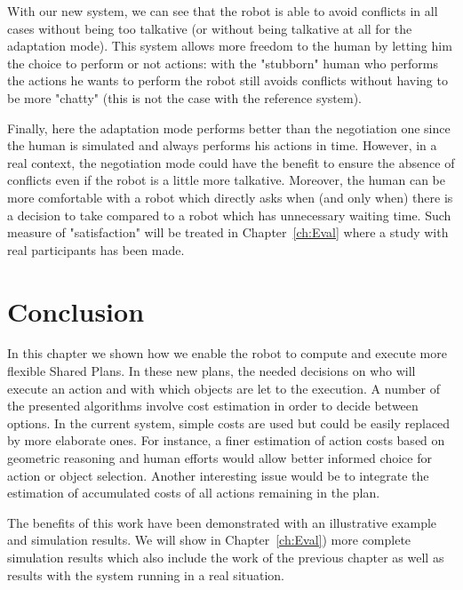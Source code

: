 \documentclass[english,a4paper,11pt,twoside]{StyleThese}
\begin{document}
With our new system, we can see that the robot is able to avoid conflicts in all cases without being too talkative (or without being talkative at all for the adaptation mode). This system allows more freedom to the human by letting him the choice to perform or not actions: with the "stubborn" human who performs the actions he wants to perform the robot still avoids conflicts without having to be more "chatty" (this is not the case with the reference system).

Finally, here the adaptation mode performs better than the negotiation one since the human is simulated and always performs his actions in time. However, in a real context, the negotiation mode could have the benefit to ensure the absence of conflicts even if the robot is a little more talkative. Moreover, the human can be more comfortable with a robot which directly asks when (and only when) there is a decision to take compared to a robot which has unnecessary waiting time. Such measure of "satisfaction" will be treated in Chapter~\ref{ch:Eval} where a study with real participants has been made.

\section{Conclusion}

In this chapter we shown how we enable the robot to compute and execute more flexible Shared Plans. In these new plans, the needed decisions on who will execute an action and with which objects are let to the execution. A number of the presented algorithms involve cost estimation in order to decide between options. In the current system, simple costs are used but could be easily replaced by more elaborate ones. For instance, a finer estimation of action costs based on geometric reasoning and human efforts would allow better informed choice for action or object selection. Another interesting issue would be to integrate the estimation of accumulated costs of all actions remaining in the plan.

The benefits of this work have been demonstrated with an illustrative example and simulation results. We will show in Chapter~\ref{ch:Eval}) more complete simulation results which also include the work of the previous chapter as well as results with the system running in a real situation.


\ifdefined{}
\else


\end{document}
